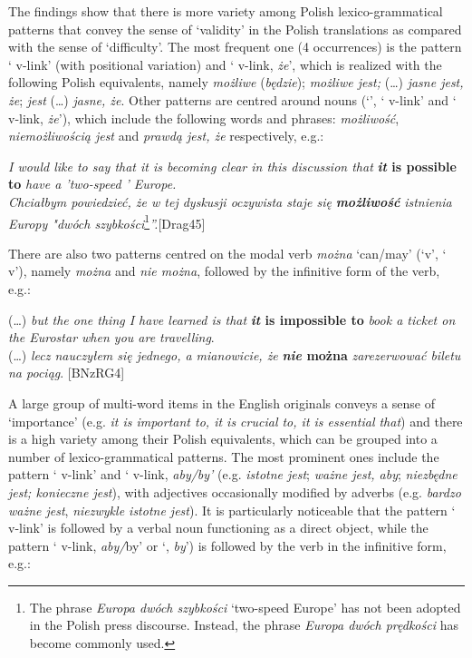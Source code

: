 \documentclass[output=paper]{langscibook}
\begin{document}
The findings show that there is more variety among Polish lexico-grammatical patterns that convey the sense of ‘validity’ in the Polish translations as compared with the sense of ‘difficulty’. The most frequent one (4 occurrences) is the pattern ‘{\ADJ} v-link’ (with positional variation) and ‘{\ADJ} v-link, \textit{że}’, which is realized with the following Polish equivalents, namely \textit{możliwe} (\textit{będzie}); \textit{możliwe jest;} (…) \textit{jasne jest, że}; \textit{jest} (…) \textit{jasne, że}. Other patterns are centred around nouns (‘{\NN}’, ‘{\NN} v-link’ and ‘{\NN} v-link, \textit{że}’), which include the following words and phrases: \textit{możliwość}, \textit{niemożliwością jest} and \textit{prawdą jest, że} respectively, e.g.:

\ea
 \textit{I would like to say that it is becoming clear in this discussion that} \textbf{\textit{it} \textbf{is} \textbf{possible} \textbf{to}} \textit{have a 'two-speed ' Europe.}\\
\textit{Chciałbym powiedzieć, że w tej dyskusji oczywista staje się} \textbf{\textit{możliwość}} \textit{istnienia Europy "dwóch szybkości}\footnote{\textrm{The phrase} \textrm{\textit{Europa dwóch szybkości}} \textrm{‘two-speed Europe’ has not been adopted in the Polish press discourse. Instead, the phrase} \textrm{\textit{Europa dwóch prędkości}} \textrm{has become commonly used.} }\textit{”.}[Drag45]
\z

There are also two patterns centred on the modal verb \textit{można} ‘can/may’ (‘{\MOD}v’, ‘{\NEG} {\PRT} {\MOD}v’), namely \textit{można} and \textit{nie można}, followed by the infinitive form of the verb, e.g.:

\ea
 (…) \textit{but the one thing I have learned is that} \textbf{\textit{it} \textbf{is} \textbf{impossible} \textbf{to}} \textit{book a ticket on the Eurostar when you are travelling}.\\
 (…) \textit{lecz nauczyłem się jednego, a mianowicie, że} \textbf{\textit{nie} \textbf{można}} \textit{zarezerwować biletu na pociąg}. [BNzRG4]
\z

A large group of multi-word items in the English originals conveys a sense of ‘importance’ (e.g. \textit{it is important to, it is crucial to, it is essential that}) and there is a high variety among their Polish equivalents, which can be grouped into a number of lexico-grammatical patterns. The most prominent ones include the pattern ‘{\ADJ} v-link’ and ‘{\ADJ} v-link, \textit{aby/by’} (e.g. \textit{istotne jest}; \textit{ważne jest, aby}; \textit{niezbędne jest; konieczne jest}), with adjectives occasionally modified by adverbs (e.g. \textit{bardzo ważne jest}, \textit{niezwykle istotne jest}). It is particularly noticeable that the pattern ‘{\ADJ} v-link’ is followed by a verbal noun functioning as a direct object, while the pattern ‘{\ADJ} v-link, \textit{aby/}by’ or ‘{\ADJ}, \textit{by}’) is followed by the verb in the infinitive form, e.g.:
\end{document}
